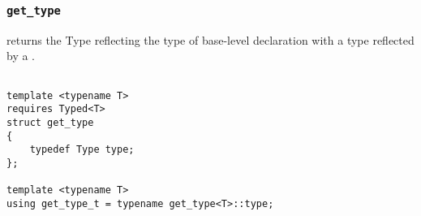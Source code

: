 
\subsubsection{\texttt{get\_type}}

returns the Type reflecting the type of base-level declaration with a type reflected by a .

\begin{verbatim}

template <typename T>
requires Typed<T>
struct get_type
{
	typedef Type type;
};
	
template <typename T>
using get_type_t = typename get_type<T>::type;

\end{verbatim}

